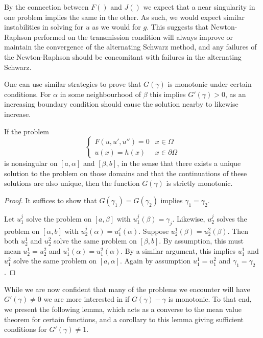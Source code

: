 \documentclass{book}
\begin{document}
By the connection between $F()$ and $J()$ we expect that a near singularity in one problem implies the same in the other.
As such, we would expect similar instabilities in solving for $u$ as we would for $g$.
This suggests that Newton-Raphson performed on the transmission condition will always improve or maintain the convergence of the alternating Schwarz method, and any failures of the Newton-Raphson should be concomitant with failures in the alternating Schwarz.

One can use similar strategies to prove that $G(\gamma)$ is monotonic under certain conditions.
For $\alpha$ in some neighbourhood of $\beta$ this implies $G'(\gamma)>0$, as an increasing boundary condition should cause the solution nearby to likewise increase.

\begin{thm}
If the problem
\begin{equation*}
\begin{cases} F(u,u',u'') = 0 & x \in \Omega \\ u(x) = h(x) & x \in \partial \Omega \end{cases}
\end{equation*}
is nonsingular on $[a,\alpha]$ and $[\beta,b]$, in the sense that there exists a unique solution to the problem on those domains and that the continuations of these solutions are also unique, then the function $G(\gamma)$ is strictly monotonic.
\end{thm}

\begin{proof}
It suffices to show that $G(\gamma_1) = G(\gamma_2)$ implies $\gamma_1 = \gamma_2$.

Let $u^j_1$ solve the problem on $[a,\beta]$ with $u^j_1(\beta) = \gamma_j$.
Likewise, $u^j_2$ solves the problem on $[\alpha, b]$ with $u^j_2(\alpha) = u^j_1(\alpha)$.
Suppose $u^1_2(\beta) = u^2_2(\beta)$.
Then both $u^1_2$ and $u^2_2$ solve the same problem on $[\beta,b]$.
By assumption, this must mean $u^1_2 = u^2_2$ and $u^1_1(\alpha) = u^2_1(\alpha)$.
By a similar argument, this implies $u^1_1$ and $u^2_1$ solve the same problem on $[a,\alpha]$.
Again by assumption $u^1_1 = u^2_1$ and $\gamma_1 = \gamma_2$.
\end{proof}

While we are now confident that many of the problems we encounter will have $G'(\gamma) \neq 0$ we are more interested in if $G(\gamma) - \gamma$ is monotonic.
To that end, we present the following lemma, which acts as a converse to the mean value theorem for certain functions, and a corollary to this lemma giving sufficient conditions for $G'(\gamma) \neq 1$.
\end{document}
